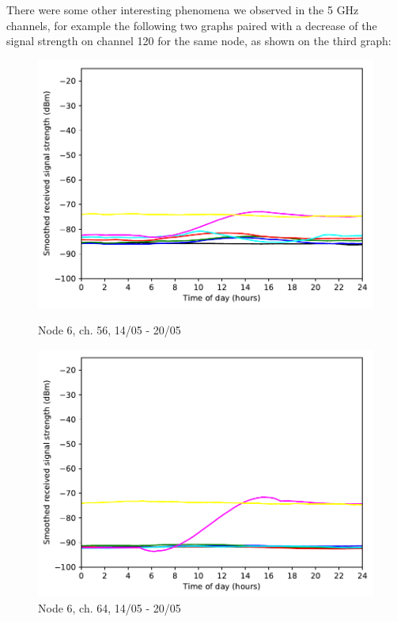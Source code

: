 \documentclass[a4paper, 11pt]{article}
\begin{document}
There were some other interesting phenomena we observed in the 5 GHz channels, for example the following two graphs paired with a decrease of the signal strength on channel 120 for the same node, as shown on the third graph: \newpage
\begin{figure}[!h]
\begin{minipage}{0.47\textwidth}
	\centering
	\includegraphics[width=\textwidth]{images/5_GHz/cot-node6-student_2017-05-20_chan56_image.pdf}
	\caption{Node 6, ch. 56, 14/05 - 20/05}
	\label{node6_5ghz_traffic_chan56}
\end{minipage}\hfill
\begin{minipage}{0.47\textwidth}
	\centering
	\includegraphics[width=\textwidth]{images/5_GHz/cot-node6-student_2017-05-20_chan64_image.pdf}
	\caption{Node 6, ch. 64, 14/05 - 20/05}
	\label{node6_5ghz_traffic_chan64}
\end{minipage}\hfill
\end{figure}
\end{document}
